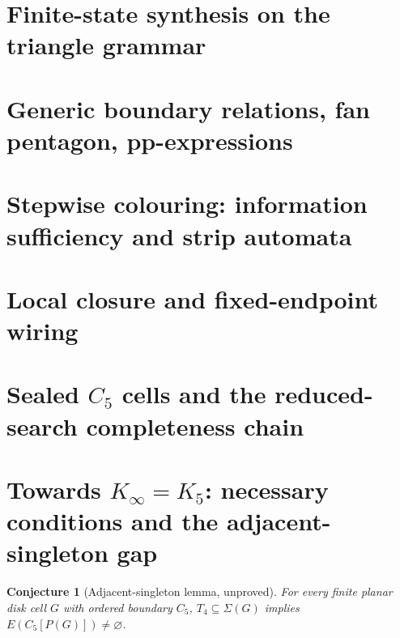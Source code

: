 \documentclass[11pt]{article}
\newtheorem{conjecture}[theorem]{Conjecture}
\theoremstyle{definition}
\newcommand{\Sig}{\Sigma}
\newcommand{\Tfour}{T_4}
\newcommand{\Kk}[1]{K_{#1}}
\begin{document}
\section{Finite-state synthesis on the triangle grammar}\label{sec:automata}

\section{Generic boundary relations, fan pentagon, pp-expressions}\label{sec:relations}

\section{Stepwise colouring: information sufficiency and strip automata}\label{sec:stepwise}

\section{Local closure and fixed-endpoint wiring}\label{sec:local}

\section{Sealed \texorpdfstring{$C_5$}{C5} cells and the reduced-search completeness chain}\label{sec:cells}

\section{Towards \texorpdfstring{$\Kk\infty=\Kk5$}{K∞=K5}: necessary conditions and the adjacent-singleton gap}\label{sec:kinf}
\begin{conjecture}[Adjacent-singleton lemma, unproved]
For every finite planar disk cell $G$ with ordered boundary $C_5$,
$\Tfour\subseteq\Sig(G)$ implies $E(C_5[P(G)])\neq\varnothing$.
\end{conjecture}
\end{document}
